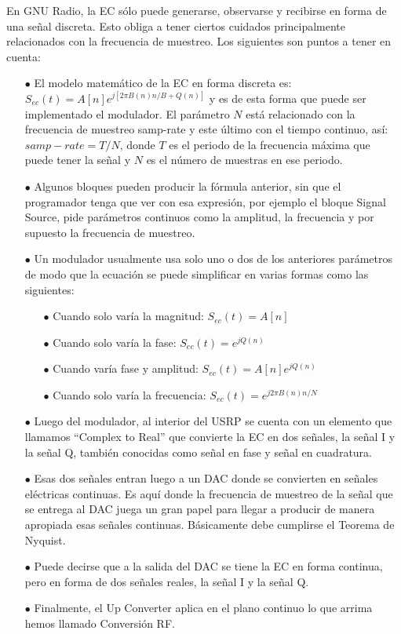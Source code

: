 En GNU Radio, la EC sólo puede generarse, observarse y recibirse en forma de una señal discreta. Esto obliga a tener ciertos cuidados principalmente relacionados con la frecuencia de muestreo. Los siguientes son puntos a tener en cuenta:\\

\begin{itemize}
	\item [$\bullet$] El modelo matemático de la EC en forma discreta es: $S_{ec}(t) = A[n]e^{j[2\pi B(n)n/B +Q(n) ]}$ y es de esta forma que puede ser implementado el modulador. El parámetro $N$ está relacionado con la frecuencia de muestreo samp-rate y este último con el tiempo continuo, así: \\
	$samp-rate=T/N$, donde $T$ es el periodo de la frecuencia máxima que puede tener la señal y $N$ es el número de muestras en ese periodo.
	\item [$\bullet$] Algunos bloques pueden producir la fórmula anterior, sin que el programador tenga que ver con esa expresión, por ejemplo el bloque Signal Source, pide parámetros continuos como la amplitud, la frecuencia y por supuesto la frecuencia de muestreo.
	\item [$\bullet$] Un modulador usualmente usa solo uno o dos de los anteriores parámetros de modo que la ecuación se puede simplificar en varias formas como las siguientes:	
	\begin{itemize}
		\item [$\bullet$] Cuando solo varía la magnitud: $S_{ec}(t)= A[n]$	
		\item [$\bullet$] Cuando solo varía la fase: $S_{ec}(t)= e^{jQ(n)}$
		\item [$\bullet$] Cuando varía fase y amplitud: $S_{ec}(t) = A[n]e^{jQ(n)}$
		\item [$\bullet$] Cuando solo varía la frecuencia: $S_{ec}(t) = e^{j2\pi B(n)n/N }$
	\end{itemize}
   
	\item [$\bullet$] Luego del modulador, al interior del USRP se cuenta con un elemento que llamamos “Complex to Real” que convierte la EC en dos señales, la señal I y la señal Q, también conocidas como señal en fase y señal en cuadratura.
	\item [$\bullet$] Esas dos señales entran luego a un DAC donde se convierten en señales eléctricas continuas. Es aquí donde la frecuencia de muestreo de la señal que se entrega al DAC juega un gran papel para llegar a producir de manera apropiada esas señales continuas. Básicamente debe cumplirse el Teorema de Nyquist.	
	\item [$\bullet$]Puede decirse que a la salida del DAC se tiene la EC en forma continua, pero en forma de dos señales reales, la señal I y la señal Q.
	\item [$\bullet$] Finalmente, el Up Converter aplica en el plano continuo lo que arrima hemos llamado Conversión RF.
\end{itemize}

